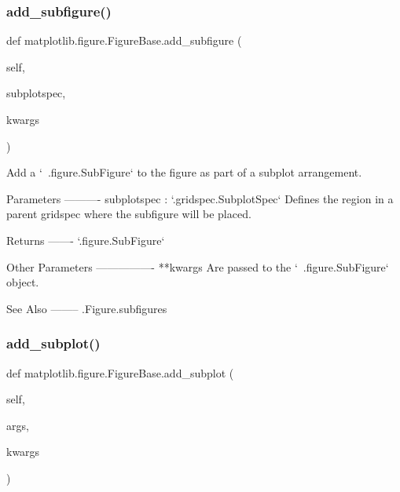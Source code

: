 \subsubsection{\texorpdfstring{add\+\_\+subfigure()}{add\_subfigure()}}
{\footnotesize\ttfamily def matplotlib.\+figure.\+Figure\+Base.\+add\+\_\+subfigure (\begin{DoxyParamCaption}\item[{}]{self,  }\item[{}]{subplotspec,  }\item[{}]{kwargs }\end{DoxyParamCaption})}

\begin{DoxyVerb}Add a `~.figure.SubFigure` to the figure as part of a subplot
arrangement.

Parameters
----------
subplotspec : `.gridspec.SubplotSpec`
    Defines the region in a parent gridspec where the subfigure will
    be placed.

Returns
-------
`.figure.SubFigure`

Other Parameters
----------------
**kwargs
    Are passed to the `~.figure.SubFigure` object.

See Also
--------
.Figure.subfigures
\end{DoxyVerb}
 \mbox{\label{classmatplotlib_1_1figure_1_1FigureBase_af8e902f8ae128964a8aaa1427d834bfe}} 
\subsubsection{\texorpdfstring{add\+\_\+subplot()}{add\_subplot()}}
{\footnotesize\ttfamily def matplotlib.\+figure.\+Figure\+Base.\+add\+\_\+subplot (\begin{DoxyParamCaption}\item[{}]{self,  }\item[{}]{args,  }\item[{}]{kwargs }\end{DoxyParamCaption})}

